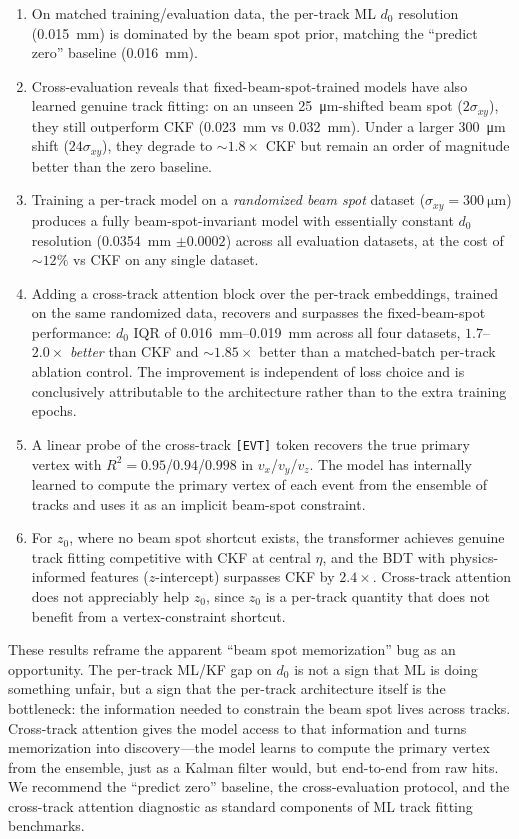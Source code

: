 \documentclass[11pt]{article}
\begin{document}
\begin{enumerate}
    \item On matched training/evaluation data, the per-track ML $d_0$ resolution (\SI{0.015}{\milli\metre}) is dominated by the beam spot prior, matching the ``predict zero'' baseline (\SI{0.016}{\milli\metre}).
    \item Cross-evaluation reveals that fixed-beam-spot-trained models have also learned genuine track fitting: on an unseen \SI{25}{\micro\metre}-shifted beam spot ($2\sigma_{xy}$), they still outperform CKF (\SI{0.023}{\milli\metre} vs \SI{0.032}{\milli\metre}). Under a larger \SI{300}{\micro\metre} shift ($24\sigma_{xy}$), they degrade to $\sim 1.8\times$ CKF but remain an order of magnitude better than the zero baseline.
    \item Training a per-track model on a \emph{randomized beam spot} dataset ($\sigma_{xy} = \SI{300}{\micro\metre}$) produces a fully beam-spot-invariant model with essentially constant $d_0$ resolution (\SI{0.0354}{\milli\metre} $\pm 0.0002$) across all evaluation datasets, at the cost of $\sim 12\%$ vs CKF on any single dataset.
    \item Adding a cross-track attention block over the per-track embeddings, trained on the same randomized data, recovers and surpasses the fixed-beam-spot performance: $d_0$ IQR of \SI{0.016}{\milli\metre}--\SI{0.019}{\milli\metre} across all four datasets, $1.7$--$2.0\times$ \emph{better} than CKF and $\sim 1.85\times$ better than a matched-batch per-track ablation control. The improvement is independent of loss choice and is conclusively attributable to the architecture rather than to the extra training epochs.
    \item A linear probe of the cross-track \texttt{[EVT]} token recovers the true primary vertex with $R^2 = 0.95$/$0.94$/$0.998$ in $v_x$/$v_y$/$v_z$. The model has internally learned to compute the primary vertex of each event from the ensemble of tracks and uses it as an implicit beam-spot constraint.
    \item For $z_0$, where no beam spot shortcut exists, the transformer achieves genuine track fitting competitive with CKF at central $\eta$, and the BDT with physics-informed features ($z$-intercept) surpasses CKF by $2.4\times$. Cross-track attention does not appreciably help $z_0$, since $z_0$ is a per-track quantity that does not benefit from a vertex-constraint shortcut.
\end{enumerate}

These results reframe the apparent ``beam spot memorization'' bug as an opportunity. The per-track ML/KF gap on $d_0$ is not a sign that ML is doing something unfair, but a sign that the per-track architecture itself is the bottleneck: the information needed to constrain the beam spot lives across tracks. Cross-track attention gives the model access to that information and turns memorization into discovery---the model learns to compute the primary vertex from the ensemble, just as a Kalman filter would, but end-to-end from raw hits. We recommend the ``predict zero'' baseline, the cross-evaluation protocol, and the cross-track attention diagnostic as standard components of ML track fitting benchmarks.
\end{document}
